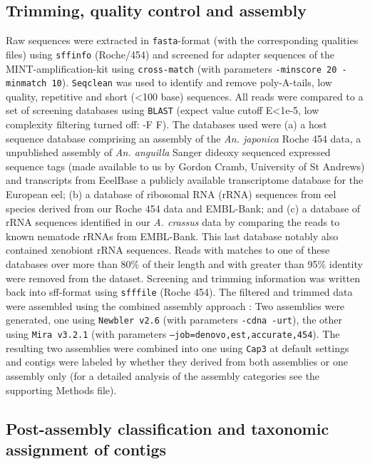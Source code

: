 \documentclass[10pt]{bmc_article}
\newenvironment{bmcformat}{\begin{raggedright}\baselineskip20pt\sloppy\setboolean{publ}{false}}{\end{raggedright}\baselineskip20pt\sloppy}
\begin{document}
\begin{bmcformat}
\subsection*{Trimming, quality control and assembly}

Raw sequences were extracted in \texttt{fasta}-format (with the
corresponding qualities files) using \texttt{sffinfo} (Roche/454) and
screened for adapter sequences of the MINT-amplification-kit using
\texttt{cross-match} \cite{PHRAP} (with parameters \texttt{-minscore
  20 -minmatch 10}). \texttt{Seqclean} \cite{tgicl_pertea} was used to
identify and remove poly-A-tails, low quality, repetitive and short
(<100 base) sequences. All reads were compared to a set of screening
databases using \texttt{BLAST} (expect value cutoff E<1e-5, low
complexity filtering turned off: -F F). The databases used were (a) a
host sequence database comprising an assembly of the
\textit{An. japonica} Roche 454 data, a unpublished assembly of
\textit{An. anguilla} Sanger dideoxy sequenced expressed sequence tags
(made available to us by Gordon Cramb, University of St Andrews) and
transcripts from EeelBase \cite{pmid21080939} a publicly available
transcriptome database for the European eel; (b) a database of
ribosomal RNA (rRNA) sequences from eel species derived from our Roche
454 data and EMBL-Bank; and (c) a database of rRNA sequences
identified in our \textit{A. crassus} data by comparing the reads to
known nematode rRNAs from EMBL-Bank. This last database notably also
contained xenobiont rRNA sequences. Reads with matches to one of these
databases over more than 80\% of their length and with greater than
95\% identity were removed from the dataset. Screening and trimming
information was written back into sff-format using \texttt{sfffile}
(Roche 454). The filtered and trimmed data were assembled using the
combined assembly approach \cite{pmid20950480}: Two assemblies were
generated, one using \texttt{Newbler v2.6} \cite{pmid16056220} (with
parameters \texttt{-cdna -urt}), the other using \texttt{Mira v3.2.1}
\cite{miraEST} (with parameters
\texttt{--job=denovo,est,accurate,454}). The resulting two assemblies
were combined into one using \texttt{Cap3} \cite{Cap3_Huang} at
default settings and contigs were labeled by whether they derived from
both assemblies or one assembly only (for a detailed analysis of the
assembly categories see the supporting Methods file).

\subsection*{Post-assembly classification and taxonomic assignment of
  contigs}


\end{bmcformat}
\end{document}
